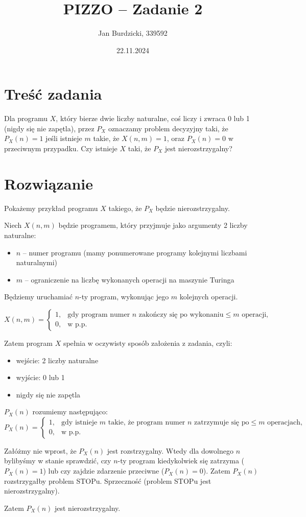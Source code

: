 \documentclass[a4paper,12pt]{article}
\title{\textbf{PIZZO – Zadanie 2}}
\author{Jan Burdzicki, 339592}
\date{22.11.2024}
\begin{document}
\maketitle

\section{Treść zadania}

Dla programu $X$, który bierze dwie liczby naturalne, coś liczy i zwraca 0 lub 1 (nigdy się nie zapętla), przez $P_X$ oznaczamy problem decyzyjny taki, że $P_X(n)=1$ jeśli istnieje $m$ takie, że $X(n, m)=1$, oraz $P_X(n)=0$ w przeciwnym przypadku. Czy istnieje $X$ taki, że $P_X$ jest nierozstrzygalny?

\section{Rozwiązanie}

Pokażemy przykład programu $X$ takiego, że $P_X$ będzie nierozstrzygalny.

\noindent
Niech $X(n, m)$ będzie programem, który przyjmuje jako argumenty 2 liczby naturalne:
\begin{itemize}
	\item $n$ – numer programu (mamy ponumerowane programy kolejnymi liczbami naturalnymi)
	\item $m$ – ograniczenie na liczbę wykonanych operacji na maszynie Turinga
\end{itemize}

\noindent
Będziemy uruchamiać $n$-ty program, wykonując jego $m$ kolejnych operacji.

\[
X(n, m) =
\begin{cases}
1, & \text{gdy program numer } n \text{ zakończy się po wykonaniu} \le m \text{ operacji}, \\
0, & \text{w p.p.}
\end{cases}
\]

\noindent
Zatem program $X$ spełnia w oczywisty sposób założenia z zadania, czyli:
\begin{itemize}
	\item wejście: 2 liczby naturalne
	\item wyjście: 0 lub 1
	\item nigdy się nie zapętla
\end{itemize}

\noindent
$P_X(n)$ rozumiemy następująco:
\[
P_X(n) =
\begin{cases}
1, & \text{gdy istnieje } m \text{ takie, że program numer } n \text{ zatrzymuje się po} \le m \text{ operacjach}, \\
0, & \text{w p.p.}
\end{cases}
\]

\noindent
Załóżmy nie wprost, że $P_X(n)$ jest rozstrzygalny.
Wtedy dla dowolnego $n$ bylibyśmy w stanie sprawdzić, czy $n$-ty program kiedykolwiek się zatrzyma ($P_X(n) = 1$) lub czy zajdzie zdarzenie przeciwne ($P_X(n) = 0$). Zatem $P_X(n)$ rozstrzygałby problem STOPu. Sprzeczność (problem STOPu jest nierozstrzygalny).

\bigskip

\noindent
Zatem $P_X(n)$ jest nierozstrzygalny.
\end{document}
